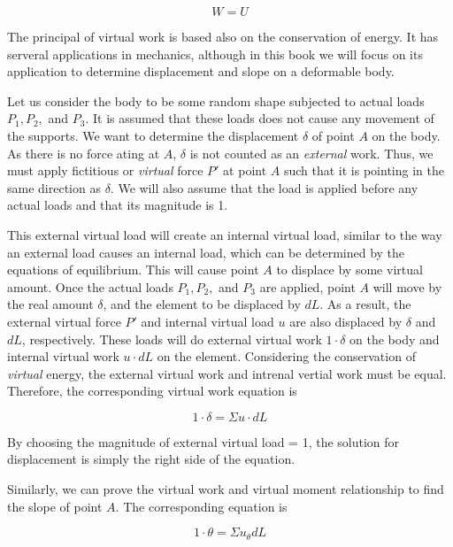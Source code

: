 \documentclass[
10pt,
a4paper,
openany,
svgnames,
]{kaobook} %
\begin{document}
\begin{equation}
  W = U
\end{equation}

The principal of virtual work is based also on the conservation of energy. It has serveral applications in mechanics, although in this book we will focus on its application to determine displacement and slope on a deformable body.

Let us consider the body to be some random shape subjected to actual loads $P_1, P_2,$ and $P_3$. It is assumed that these loads does not cause any movement of the supports. We want to determine the displacement $\delta$ of point $A$ on the body. As there is no force ating at $A$, $\delta$ is not counted as an \emph{external} work. Thus, we must apply fictitious or \emph{virtual} force $P'$ at point $A$ such that it is pointing in the same direction as $\delta$. We will also assume that the load is applied before any actual loads and that its magnitude is 1.

This external virtual load will create an internal virtual load, similar to the way an external load causes an internal load, which can be determined by the equations of equilibrium. This will cause point $A$ to displace by some virtual amount. Once the actual loads $P_1, P_2,$ and $P_3$ are applied, point $A$ will move by the real amount $\delta$, and the element to be displaced by $dL$. As a result, the external virtual force $P'$ and internal virtual load $u$ are also displaced by $\delta$ and $dL$, respectively. These loads will do external virtual work $1 \cdot \delta$ on the body and internal virtual work $u \cdot dL$ on the element. Considering the conservation of \emph{virtual} energy, the external virtual work and intrenal vertial work must be equal. Therefore, the corresponding virtual work equation is

\begin{equation}
  1 \cdot \delta = \Sigma u \cdot dL
\end{equation}

By choosing the magnitude of external virtual load = 1, the solution for displacement is simply the right side of the equation.

Similarly, we can prove the virtual work and virtual moment relationship to find the slope of point $A$. The corresponding equation is

\begin{equation}
  1 \cdot \theta = \Sigma u_\theta dL
\end{equation}
\end{document}
